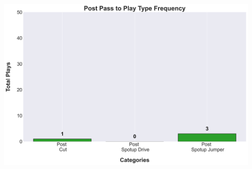 \documentclass[a4paper,12pt]{article}
\begin{document}
\begin{table}[H]
{\begin{minipage}[t]{0.6\textwidth}
{\begin{tabular}
            
                
            
                
            
                
            
                
            
                
            
                
            
                
            
                
            
                
            
                
            
                
            
                
            
                
            
                
            


            \bottomrule
            \end{tabular}
        }
    \end{minipage}
    }
    \hfill %
    \begin{minipage}[c]{0.35\textwidth} %
        \flushright
        \includegraphics[width=\textwidth, height=.14\textheight]{images/Post_PassPlayType_Freq.png} %
    \end{minipage}
\end{table}

\vspace{-1em} %
\vspace{1em} %
\end{document}
